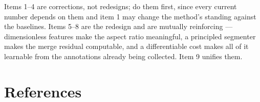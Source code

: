 \documentclass[11pt]{article}
\begin{document}
\vspace{-0.5em}
Items 1--4 are corrections, not redesigns; do them first, since every current number depends
on them and item 1 may change the method's standing against the baselines. Items 5--8 are the
redesign and are mutually reinforcing --- dimensionless features make the aspect ratio
meaningful, a principled segmenter makes the merge residual computable, and a differentiable
cost makes all of it learnable from the annotations already being collected. Item 9 unifies
them.

\section*{References}
\end{document}
